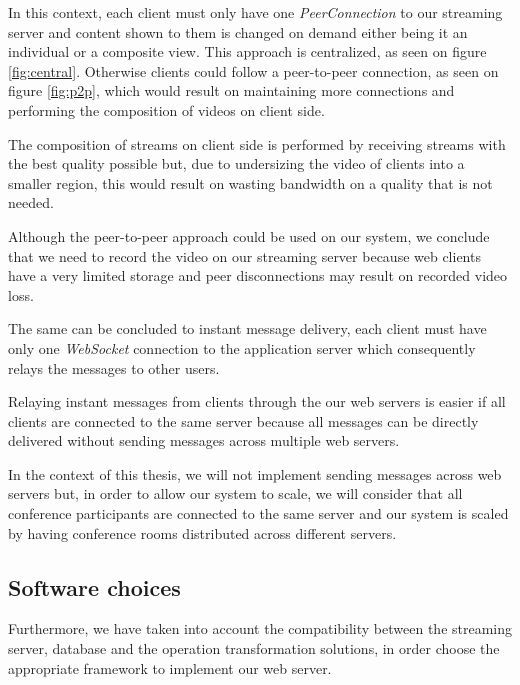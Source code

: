 	In this context, each client must only have one \emph{PeerConnection} to our streaming server and content shown to them is changed on demand either being it an individual or a composite view. This approach is centralized, as seen on figure \ref{fig:central}. Otherwise clients could follow a peer-to-peer connection, as seen on figure \ref{fig:p2p}, which would result on maintaining more connections and performing the composition of videos on client side.

	The composition of streams on client side is performed by receiving streams with the best quality possible but, due to undersizing the video of clients into a smaller region, this would result on wasting bandwidth on a quality that is not needed.

	Although the peer-to-peer approach could be used on our system, we conclude that we need to record the video on our streaming server because web clients have a very limited storage and peer disconnections may result on recorded video loss. 

	The same can be concluded to instant message delivery, each client must have only one \emph{WebSocket} connection to the application server which consequently relays the messages to other users.

	Relaying instant messages from clients through the our web servers is easier if all clients are connected to the same server because all messages can be directly delivered without sending messages across multiple web servers. 

	In the context of this thesis, we will not implement sending messages across web servers but, in order to allow our system to scale, we will consider that all conference participants are connected to the same server and our system is scaled by having conference rooms distributed across different servers.

\subsection{Software choices}

Furthermore, we have taken into account the compatibility between the streaming server, database and the operation transformation solutions, in order choose the appropriate framework to implement our web server.

